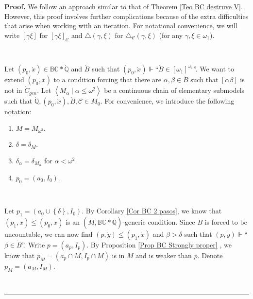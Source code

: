 \documentclass{article}
\newenvironment{proof}[1][Proof]{\noindent\textbf{#1.} }{\ \rule{0.5em}{0.5em}}
\begin{document}
\begin{proof}
We follow an approach similar to that of Theorem \ref{Teo BC destruve V}.
However, this proof involves further complications because of the extra
difficulties that arise when working with an iteration. For notational
convenience, we will write $\left[  \gamma\xi\right]  $ for $\left[  \gamma
\xi\right]  _{\mathcal{C}}$ and $\triangle\left(  \gamma,\xi\right)  $ for
$\triangle_{\mathcal{C}}\left(  \gamma,\xi\right)  $ (for any $\gamma,\xi
\in\omega_{1}$).

\qquad\ \ \ \qquad\ \ \ 

Let $\left(  p_{0},\dot{x}\right)  \in\mathbb{BC\ast\dot{Q}}$ and $\dot{B}$
such that $\left(  p_{0},\dot{x}\right)  \Vdash$\textquotedblleft$\dot{B}%
\in\left[  \omega_{1}\right]  ^{\omega_{1}}$\textquotedblright. We want to
extend $\left(  p_{0},\dot{x}\right)  $ to a condition forcing that there are
$\alpha,\beta\in\dot{B}$ such that $\left[  \alpha\beta\right]  $ is not in
$\dot{C}_{gen}$. Let $\left\langle M_{\alpha}\mid\alpha\leq\omega
^{2}\right\rangle $ be a continuous chain of elementary submodels such that
$\mathbb{\dot{Q}},\left(  p_{0},\dot{x}\right)  ,\dot{B},\mathcal{C}\in M_{0}%
$. For convenience, we introduce the following notation:

\begin{enumerate}
\item $M=M_{\omega^{2}}.$

\item $\delta=\delta_{M}.$

\item $\delta_{\alpha}=\delta_{M_{\alpha}}$ for $\alpha<\omega^{2}.$

\item $p_{0}=\left(  a_{0},I_{0}\right)  .$
\end{enumerate}

\qquad\ \ \qquad\ \ 

Let $p_{1}=\left(  a_{0}\cup\left\{  \delta\right\}  ,I_{0}\right)  .$ By
Corollary \ref{Cor BC 2 pasos}, we know that $\left(  p_{1},\dot{x}\right)
\leq(p_{0},\dot{x})$ is an $(M,\mathbb{BC\ast\dot{Q}})$-generic condition.
Since $\dot{B}$ is forced to be uncountable, we can now find $(p,\dot{y}%
)\leq\left(  p_{1},\dot{x}\right)  $ and $\beta>\delta$ such that $(p,\dot
{y})\Vdash$\textquotedblleft$\beta\in\dot{B}$\textquotedblright. Write
$p=\left(  a_{p},I_{p}\right)  .$ By Proposition \ref{Prop BC Strongly proper}%
, we know that $p_{M}=\left(  a_{p}\cap M,I_{p}\cap M\right)  $ is in $M$ and
is weaker than $p.$ Denote $p_{M}=\left(  a_{M},I_{M}\right)  .$


\end{proof}
\end{document}
